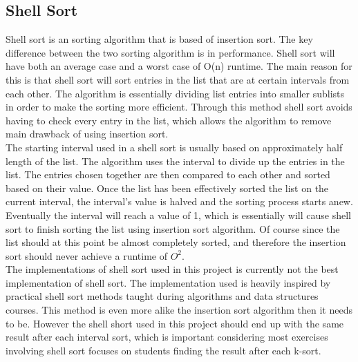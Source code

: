 \subsection{Shell Sort}
Shell sort is an sorting algorithm that is based of insertion sort. The key difference between the two sorting algorithm is in performance. Shell sort will have both an average case and a worst case of O(n) runtime. The main reason for this is that shell sort will sort entries in the list that are at certain intervals from each other. The algorithm is essentially dividing list entries into smaller sublists in order to make the sorting more efficient. Through this method shell sort avoids having to check every entry in the list, which allows the algorithm to remove main drawback of using insertion sort.
\\[11pt]
The starting interval used in a shell sort is usually based on approximately half length of the list. The algorithm uses the interval to divide up the entries in the list. The entries chosen together are then compared to each other and sorted based on their value. Once the list has been effectively sorted the list on the current interval, the interval's value is halved and the sorting process starts anew. Eventually the interval will reach a value of 1, which is essentially will cause shell sort to finish sorting the list using insertion sort algorithm. Of course since the list should at this point be almost completely sorted, and therefore the insertion sort should never achieve a runtime of $O^2$.
\\[11pt]
The implementations of shell sort used in this project is currently not the best implementation of shell sort. The implementation used is heavily inspired by practical shell sort methods taught during algorithms and data structures courses. This method is even more alike the insertion sort algorithm then it needs to be. However the shell short used in this project should end up with the same result after each interval sort, which is important considering most exercises involving shell sort focuses on students finding the result after each k-sort.\cite{ShellSort:Geeks}  